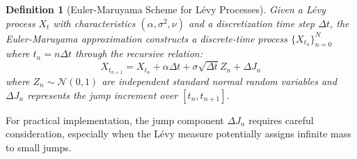 \documentclass[a4paper,12pt]{report}
\newtheorem{definition}{Definition}
\begin{document}
\begin{definition}[Euler-Maruyama Scheme for Lévy Processes]
    Given a Lévy process $X_t$ with characteristics $(\alpha, \sigma^2, \nu)$ and a discretization time step $\Delta t$, the Euler-Maruyama approximation constructs a discrete-time process $\{X_{t_n}\}_{n=0}^N$ where $t_n = n\Delta t$ through the recursive relation:
    \begin{equation}
        X_{t_{n+1}} = X_{t_n} + \alpha \Delta t + \sigma\sqrt{\Delta t}Z_n + \Delta J_n
    \end{equation}
    where $Z_n \sim \mathcal{N}(0,1)$ are independent standard normal random variables and $\Delta J_n$ represents the jump increment over $[t_n, t_{n+1}]$.
\end{definition}
\iffalse
    For practical implementation, the jump component $\Delta J_n$ requires careful consideration, especially when the Lévy measure potentially assigns infinite mass to small jumps.
\end{document}

